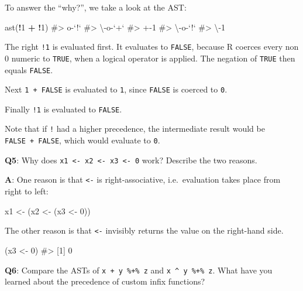\documentclass[
]{krantz}
\makeatletter
\newenvironment{Shaded}{\begin{snugshade}}{\end{snugshade}}
\newcommand{\CommentTok}[1]{\textcolor[rgb]{0.56,0.35,0.01}{\textit{#1}}}
\newcommand{\DecValTok}[1]{\textcolor[rgb]{0.00,0.00,0.81}{#1}}
\newcommand{\KeywordTok}[1]{\textcolor[rgb]{0.13,0.29,0.53}{\textbf{#1}}}
\newcommand{\NormalTok}[1]{#1}
\newcommand{\OperatorTok}[1]{\textcolor[rgb]{0.81,0.36,0.00}{\textbf{#1}}}
\newcommand{\StringTok}[1]{\textcolor[rgb]{0.31,0.60,0.02}{#1}}
\newenvironment{kframe}{%
\medskip{}
\setlength{\fboxsep}{.8em}
 \def\at@end@of@kframe{}%
 \ifinner\ifhmode%
  \def\at@end@of@kframe{\end{minipage}}%
  \begin{minipage}{\columnwidth}%
 \fi\fi%
 \def\FrameCommand##1{\hskip\@totalleftmargin \hskip-\fboxsep
 \colorbox{shadecolor}{##1}\hskip-\fboxsep
     \hskip-\linewidth \hskip-\@totalleftmargin \hskip\columnwidth}%
 \MakeFramed {\advance\hsize-\width
   \@totalleftmargin\z@ \linewidth\hsize
   \@setminipage}}%
 {\par\unskip\endMakeFramed%
 \at@end@of@kframe}
\renewenvironment{Shaded}{\begin{kframe}}{\end{kframe}}
\renewcommand{\KeywordTok} [1]{\textcolor[rgb]{0.00,0.44,0.13}{{#1}}}
\renewcommand{\DecValTok}  [1]{\textcolor[rgb]{0.25,0.63,0.44}{{#1}}}
\renewcommand{\StringTok}  [1]{\textcolor[rgb]{0.25,0.44,0.63}{{#1}}}
\renewcommand{\CommentTok} [1]{\textcolor[rgb]{0.38,0.63,0.69}{{#1}}}
\renewcommand{\NormalTok}  [1]{{#1}}
\makeatother
\begin{document}
To answer the ``why?'', we take a look at the AST:

\begin{Shaded}
\begin{Highlighting}[]
\KeywordTok{ast}\NormalTok{(}\OperatorTok{!}\DecValTok{1} \OperatorTok{+}\StringTok{ }\OperatorTok{!}\DecValTok{1}\NormalTok{)}
\CommentTok{#> o-`!` }
\CommentTok{#> \textbackslash{}-o-`+` }
\CommentTok{#>   +-1 }
\CommentTok{#>   \textbackslash{}-o-`!` }
\CommentTok{#>     \textbackslash{}-1}
\end{Highlighting}
\end{Shaded}

The right \texttt{!1} is evaluated first. It evaluates to \texttt{FALSE}, because R coerces every non 0 numeric to \texttt{TRUE}, when a logical operator is applied. The negation of \texttt{TRUE} then equals \texttt{FALSE}.

Next \texttt{1\ +\ FALSE} is evaluated to \texttt{1}, since \texttt{FALSE} is coerced to \texttt{0}.

Finally \texttt{!1} is evaluated to \texttt{FALSE}.

Note that if \texttt{!} had a higher precedence, the intermediate result would be \texttt{FALSE\ +\ FALSE}, which would evaluate to \texttt{0}.

\textbf{{Q5}}: Why does \texttt{x1\ \textless{}-\ x2\ \textless{}-\ x3\ \textless{}-\ 0} work? Describe the two reasons.

\textbf{{A}}: One reason is that \texttt{\textless{}-} is right-associative, i.e.~evaluation takes place from right to left:

\begin{Shaded}
\begin{Highlighting}[]
\NormalTok{x1 <-}\StringTok{ }\NormalTok{(x2 <-}\StringTok{ }\NormalTok{(x3 <-}\StringTok{ }\DecValTok{0}\NormalTok{))}
\end{Highlighting}
\end{Shaded}

The other reason is that \texttt{\textless{}-} invisibly returns the value on the right-hand side.

\begin{Shaded}
\begin{Highlighting}[]
\NormalTok{(x3 <-}\StringTok{ }\DecValTok{0}\NormalTok{)}
\CommentTok{#> [1] 0}
\end{Highlighting}
\end{Shaded}

\textbf{{Q6}}: Compare the ASTs of \texttt{x\ +\ y\ \%+\%\ z} and \texttt{x\ \^{}\ y\ \%+\%\ z}. What have you learned about the precedence of custom infix functions?
\end{document}
